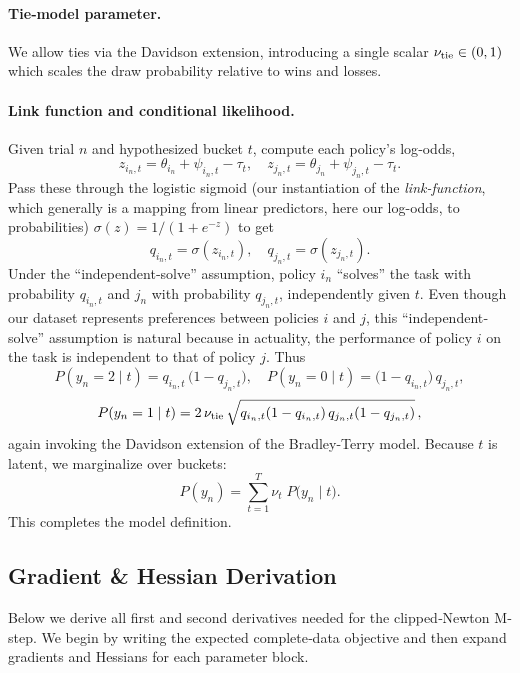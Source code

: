 \paragraph{Tie‐model parameter.}  
We allow ties via the Davidson extension, introducing a single scalar \(\nu_{\rm tie}\in(0,1)\) which scales the draw probability relative to wins and losses.

\paragraph{Link function and conditional likelihood.}  
Given trial \(n\) and hypothesized bucket \(t\), compute each policy’s log‐odds,
\[
  z_{i_n,t}
    = \theta_{i_n} + \psi_{i_n,t} - \tau_t,
  \quad
  z_{j_n,t}
    = \theta_{j_n} + \psi_{j_n,t} - \tau_t.
\]
Pass these through the logistic sigmoid (our instantiation of the \emph{link-function}, which generally is a mapping from linear predictors, here our log-odds, to probabilities) \(\sigma(z)=1/(1+e^{-z})\) to get
\[
  q_{i_n,t} = \sigma(z_{i_n,t}),
  \quad
  q_{j_n,t} = \sigma(z_{j_n,t}).
\]
Under the “independent‐solve” assumption, policy \(i_n\) “solves” the task with probability \(q_{i_n,t}\) and \(j_n\) with probability \(q_{j_n,t}\), independently given \(t\).  Even though our dataset represents preferences between policies $i$ and $j$, this “independent‐solve” assumption is natural because in actuality, the performance of policy $i$ on the task is independent to that of policy $j$. Thus
\[
  P(y_n=2\mid t)
    = q_{i_n,t}\,\bigl(1 - q_{j_n,t}\bigr),
  \quad
  P(y_n=0\mid t)
    = \bigl(1 - q_{i_n,t}\bigr)\,q_{j_n,t},
\]
\[
  P(y_n=1\mid t)
    = 2\,\nu_{\rm tie}\,
      \sqrt{q_{i_n,t}(1 - q_{i_n,t})\,q_{j_n,t}(1 - q_{j_n,t})}\,,
\]
again invoking the Davidson extension of the Bradley-Terry model. Because \(t\) is latent, we marginalize over buckets:
\[
  P(y_n)
   = \sum_{t=1}^{T} \nu_t \;P\!\bigl(y_n\mid t\bigr).
\]
This completes the model definition.


\subsection{Gradient \& Hessian Derivation}
\label{app:grad_hess}

Below we derive all first and second derivatives needed for the clipped‐Newton M‐step.  We begin by writing the expected complete‐data objective and then expand gradients and Hessians for each parameter block.

